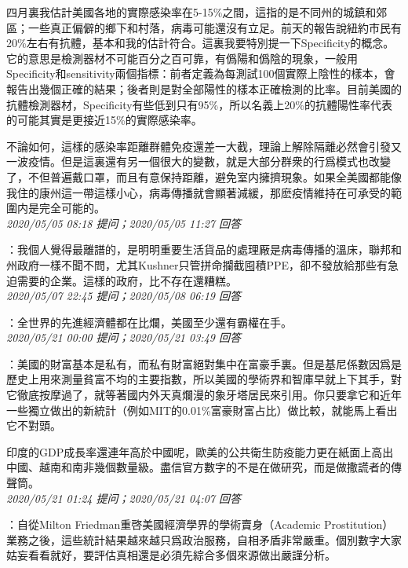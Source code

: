 \documentclass[twocolumn]{ctexart}
\begin{document}
四月裏我估計美國各地的實際感染率在5-15\%之間，這指的是不同州的城鎮和郊區；一些真正偏僻的鄉下和村落，病毒可能還沒有立足。前天的報告說紐約市民有20\%左右有抗體，基本和我的估計符合。這裏我要特別提一下Specificity的概念。它的意思是檢測器材不可能百分之百可靠，有僞陽和僞陰的現象，一般用Specificity和sensitivity兩個指標：前者定義為每測試100個實際上陰性的樣本，會報告出幾個正確的結果；後者則是對全部陽性的樣本正確檢測的比率。目前美國的抗體檢測器材，Specificity有些低到只有95\%，所以名義上20\%的抗體陽性率代表的可能其實是更接近15\%的實際感染率。

不論如何，這樣的感染率距離群體免疫還差一大截，理論上解除隔離必然會引發又一波疫情。但是這裏還有另一個很大的變數，就是大部分群衆的行爲模式也改變了，不但普遍戴口罩，而且有意保持距離，避免室内擁擠現象。如果全美國都能像我住的康州這一帶這樣小心，病毒傳播就會顯著減緩，那麽疫情維持在可承受的範圍内是完全可能的。
\\

\textit{\hfill\noindent\small 2020/05/05 08:18 提问；2020/05/05 11:27 回答}

：我個人覺得最離譜的，是明明重要生活貨品的處理厰是病毒傳播的溫床，聯邦和州政府一樣不聞不問，尤其Kushner只管拼命攔截囤積PPE，卻不發放給那些有急迫需要的企業。這樣的政府，比不存在還糟糕。
\\

\textit{\hfill\noindent\small 2020/05/07 22:45 提问；2020/05/08 06:19 回答}

：全世界的先進經濟體都在比爛，美國至少還有霸權在手。
\\

\textit{\hfill\noindent\small 2020/05/21 00:00 提问；2020/05/21 03:49 回答}

：美國的財富基本是私有，而私有財富絕對集中在富豪手裏。但是基尼係數因爲是歷史上用來測量貧富不均的主要指數，所以美國的學術界和智庫早就上下其手，對它徹底按摩過了，就等著國内外天真爛漫的象牙塔居民來引用。你只要拿它和近年一些獨立做出的新統計（例如MIT的0.01\%富豪財富占比）做比較，就能馬上看出它不對頭。

印度的GDP成長率還連年高於中國呢，歐美的公共衛生防疫能力更在紙面上高出中國、越南和南非幾個數量級。盡信官方數字的不是在做研究，而是做撒謊者的傳聲筒。
\\

\textit{\hfill\noindent\small 2020/05/21 01:24 提问；2020/05/21 04:07 回答}

：自從Milton Friedman重啓美國經濟學界的學術賣身（Academic Prostitution）業務之後，這些統計結果越來越只爲政治服務，自相矛盾非常嚴重。個別數字大家姑妄看看就好，要評估真相還是必須先綜合多個來源做出嚴謹分析。
\\
\end{document}

